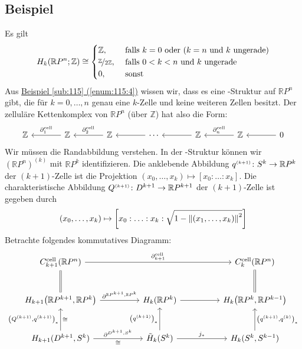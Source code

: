 \subsection[Beispiel: Homologie von $\mathds{R}P^n$]{Beispiel} %
\label{sub:1213}
Es gilt 
\[
	H_k(\mathds{R}P^n;\mathds{Z})\cong \begin{cases}
		\mathds{Z}, &\text{ falls }k=0 \text{ oder }(k=n \text{ und $k$ ungerade})\\
		\nicefrac{\mathds{Z}}{2 \mathds{Z}} ,&\text{ falls } 0<k<n \text{ und $k$ ungerade} \\
		0 ,&\text{ sonst}
	\end{cases}
\]
Aus \hyperref[enum:115:4]{Beispiel \ref*{sub:115} (\ref*{enum:115:4})} wissen wir, dass es eine \CW-Struktur auf $\mathds{R}P^n$ gibt, die für $k=0,\ldots ,n$ genau eine $k$-Zelle und keine weiteren Zellen besitzt.
Der zelluläre Kettenkomplex von $\mathds{R}P^n$ (über $\mathds{Z}$) hat also die Form:
\[
	\begin{tikzcd}[column sep=large]
		\mathds{Z} & \mathds{Z} \lar["\partial_1^{\cell}"'] & \mathds{Z} \lar["\partial_2^{\cell}"'] & \cdots \lar & \mathds{Z} \lar & \mathds{Z} 
		\lar["\partial_n^{\cell}"'] & 0 \lar
	\end{tikzcd}
\]
Wir müssen die Randabbildung verstehen. In der \CW-Struktur können wir $(\mathds{R}P^n)^{(k)}$ mit $\mathds{R}P^k$ identifizieren. Die anklebende Abbildung 
$q^\ssbrace{k+1} \colon S^k \to \mathds{R}P^k$ der $(k+1)$-Zelle ist die Projektion $(x_0, \ldots ,x_k) \mapsto [x_0 : \ldots : x_k]$. Die charakteristische Abbildung 
$Q^\ssbrace{k+1} \colon D^{k+1} \to \mathds{R}P^{k+1}$ der $(k+1)$-Zelle ist gegeben durch 
\[
	(x_0, \ldots ,x_k) \mapsto \benbrace*{x_0 : \ldots : x_k : {\textstyle\sqrt{\cramped 1- \norm{(x_1,\ldots, x_k)}^2}}} 
\]
Betrachte folgendes kommutatives Diagramm:
\[
	\begin{tikzcd}[column sep=huge, row sep=large]
		C_{k+1}^{\cell}(\mathds{R}P^n) \arrow[rr,"\partial_{k+1}^{\cell}"] \dar[equal] & & C_k^{\cell}(\mathds{R}P^n) \dar[equal]\\
		H_{k+1} \enbrace*{\mathds{R}P^{k+1},\mathds{R}P^k} \rar["\partial^{\mathds{R}P^{k+1},\mathds{R}P^k}"] & H_k(\mathds{R}P^k) \rar
		& H_k \enbrace*{\mathds{R}P^k,\mathds{R}P^{k-1}} \\
		H_{k+1}(D^{k+1},S^k) \uar["\enbrace*{Q^\ssbrace{k+1},q^\ssbrace{k+1}}_*","\cong"'] \rar["\partial^{D^{k+1},S^k}","\cong"'] & \tilde{H}_k(S^k) \uar["\enbrace*{q^\ssbrace{k+1}}_*"] \rar["j_*"] 
		& H_k(S^k,S^{k-1}) \uar["\enbrace*{q^\ssbrace{k+1},q^\ssbrace{k}}_*"']
	\end{tikzcd}
\]
